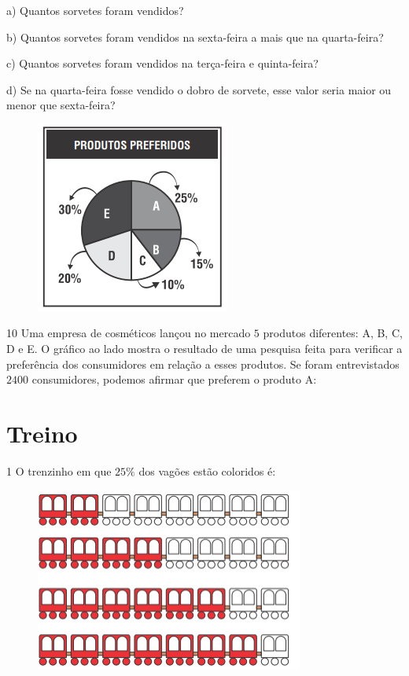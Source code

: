 a) Quantos sorvetes foram vendidos? 

b) Quantos sorvetes foram vendidos na sexta-feira a mais que na
quarta-feira? 

c) Quantos sorvetes foram vendidos na terça-feira e quinta-feira? 

d) Se na quarta-feira fosse vendido o dobro de sorvete, esse valor seria
maior ou menor que sexta-feira? 

\begin{figure}
\includegraphics[width=2.51181in,height=2.47708in]{./imgSAEB_6_MAT/media/image88.png}
\end{figure}

\num{10} Uma empresa de cosméticos lançou no mercado $5$ produtos diferentes:
A, B, C, D e E. O gráfico ao lado mostra o resultado de uma pesquisa feita para
verificar a preferência dos consumidores em relação a esses produtos. Se foram entrevistados $2400$ consumidores, podemos afirmar que preferem o
produto A:


\section{Treino}

\num{1}  O trenzinho em que $25\%$ dos vagões estão coloridos é:

\begin{figure}
\includegraphics[width=3.46528in,height=2.38403in]{./imgSAEB_6_MAT/media/image89.png}
\end{figure}


